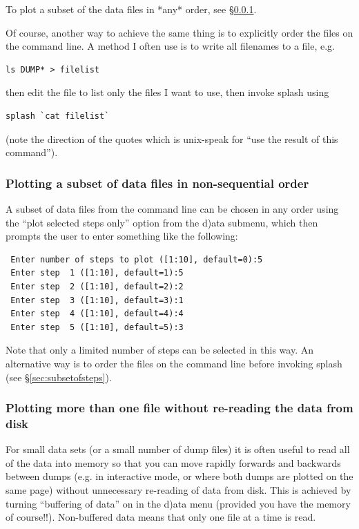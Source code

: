 \documentclass[a4paper,11pt]{article}
\begin{document}
 To plot a subset of the data files in *any* order, see \S\ref{sec:selectedstepsonly}. 

 Of course, another way to achieve the same thing is to explicitly order the files on the command line. A method I often use is to write all filenames to a file, e.g. 
\begin{verbatim}
ls DUMP* > filelist
\end{verbatim}
then edit the file to list only the files I want to use, then invoke splash using
\begin{verbatim}
splash `cat filelist`
\end{verbatim}
(note the direction of the quotes which is unix-speak for ``use the result of this command''). 

\subsubsection{ Plotting a subset of data files in non-sequential order}
\label{sec:selectedstepsonly}
 A subset of data files from the command line can be chosen in any order using the ``plot selected steps only'' option from the d)ata submenu, which then prompts the user to enter something like the following:
\begin{verbatim}
 Enter number of steps to plot ([1:10], default=0):5
 Enter step  1 ([1:10], default=1):5
 Enter step  2 ([1:10], default=2):2
 Enter step  3 ([1:10], default=3):1
 Enter step  4 ([1:10], default=4):4
 Enter step  5 ([1:10], default=5):3
\end{verbatim}
Note that only a limited number of steps can be selected in this way. An alternative way is to order the files on the command line before invoking splash (see \S\ref{sec:subsetofsteps}). 

\subsubsection{ Plotting more than one file without re-reading the data from disk}
\label{sec:buffering}
 For small data sets (or a small number of dump files) it is often useful to read all of the data into memory so that you can move rapidly forwards and backwards between dumps (e.g. in interactive mode, or where both dumps are plotted on the same page) without unnecessary re-reading of data from disk. This is achieved by turning ``buffering of data'' on in the d)ata menu (provided you have the memory of course!!). Non-buffered data means that only one file at a time is read.
\end{document}
